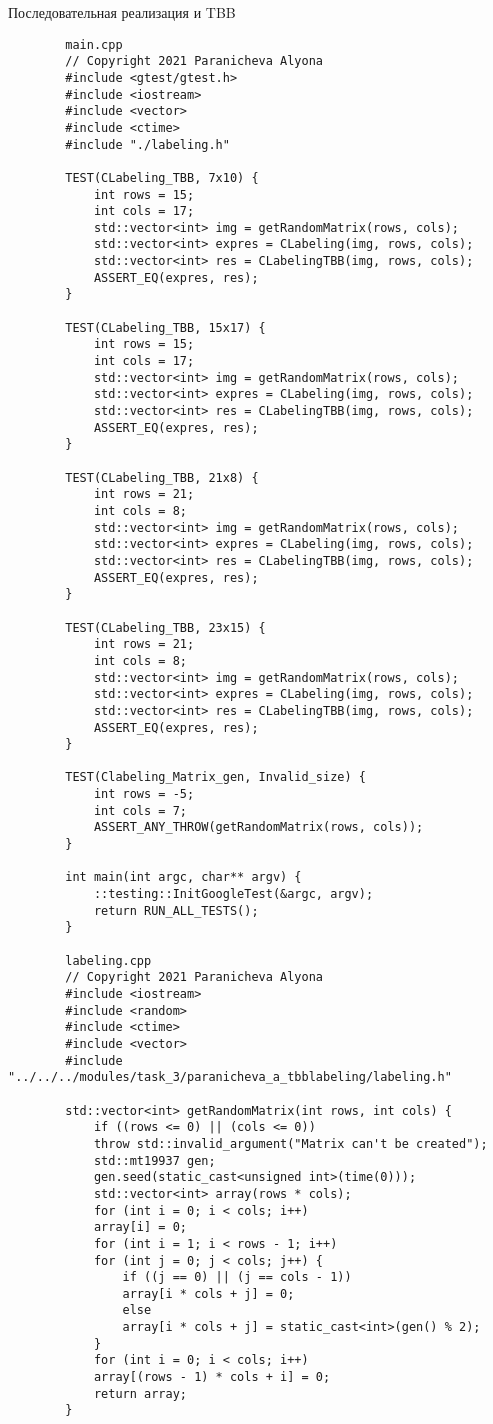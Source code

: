 \documentclass{report}
\begin{document}
	    \par Последовательная реализация и TBB
	\begin{lstlisting}
	    main.cpp
	    // Copyright 2021 Paranicheva Alyona
	    #include <gtest/gtest.h>
	    #include <iostream>
	    #include <vector>
	    #include <ctime>
	    #include "./labeling.h"
	    
	    TEST(CLabeling_TBB, 7x10) {
	    	int rows = 15;
	    	int cols = 17;
	    	std::vector<int> img = getRandomMatrix(rows, cols);
	    	std::vector<int> expres = CLabeling(img, rows, cols);
	    	std::vector<int> res = CLabelingTBB(img, rows, cols);
	    	ASSERT_EQ(expres, res);
	    }
	    
	    TEST(CLabeling_TBB, 15x17) {
	    	int rows = 15;
	    	int cols = 17;
	    	std::vector<int> img = getRandomMatrix(rows, cols);
	    	std::vector<int> expres = CLabeling(img, rows, cols);
	    	std::vector<int> res = CLabelingTBB(img, rows, cols);
	    	ASSERT_EQ(expres, res);
	    }
	    
	    TEST(CLabeling_TBB, 21x8) {
	    	int rows = 21;
	    	int cols = 8;
	    	std::vector<int> img = getRandomMatrix(rows, cols);
	    	std::vector<int> expres = CLabeling(img, rows, cols);
	    	std::vector<int> res = CLabelingTBB(img, rows, cols);
	    	ASSERT_EQ(expres, res);
	    }
	    
	    TEST(CLabeling_TBB, 23x15) {
	    	int rows = 21;
	    	int cols = 8;
	    	std::vector<int> img = getRandomMatrix(rows, cols);
	    	std::vector<int> expres = CLabeling(img, rows, cols);
	    	std::vector<int> res = CLabelingTBB(img, rows, cols);
	    	ASSERT_EQ(expres, res);
	    }
	    
	    TEST(Clabeling_Matrix_gen, Invalid_size) {
	    	int rows = -5;
	    	int cols = 7;
	    	ASSERT_ANY_THROW(getRandomMatrix(rows, cols));
	    }
	    
	    int main(int argc, char** argv) {
	    	::testing::InitGoogleTest(&argc, argv);
	    	return RUN_ALL_TESTS();
	    }
	    
	    labeling.cpp
	    // Copyright 2021 Paranicheva Alyona
	    #include <iostream>
	    #include <random>
	    #include <ctime>
	    #include <vector>
	    #include "../../../modules/task_3/paranicheva_a_tbblabeling/labeling.h"
	    
	    std::vector<int> getRandomMatrix(int rows, int cols) {
	    	if ((rows <= 0) || (cols <= 0))
	    	throw std::invalid_argument("Matrix can't be created");
	    	std::mt19937 gen;
	    	gen.seed(static_cast<unsigned int>(time(0)));
	    	std::vector<int> array(rows * cols);
	    	for (int i = 0; i < cols; i++)
	    	array[i] = 0;
	    	for (int i = 1; i < rows - 1; i++)
	    	for (int j = 0; j < cols; j++) {
	    		if ((j == 0) || (j == cols - 1))
	    		array[i * cols + j] = 0;
	    		else
	    		array[i * cols + j] = static_cast<int>(gen() % 2);
	    	}
	    	for (int i = 0; i < cols; i++)
	    	array[(rows - 1) * cols + i] = 0;
	    	return array;
	    }
	    

\end{lstlisting}
\end{document}
